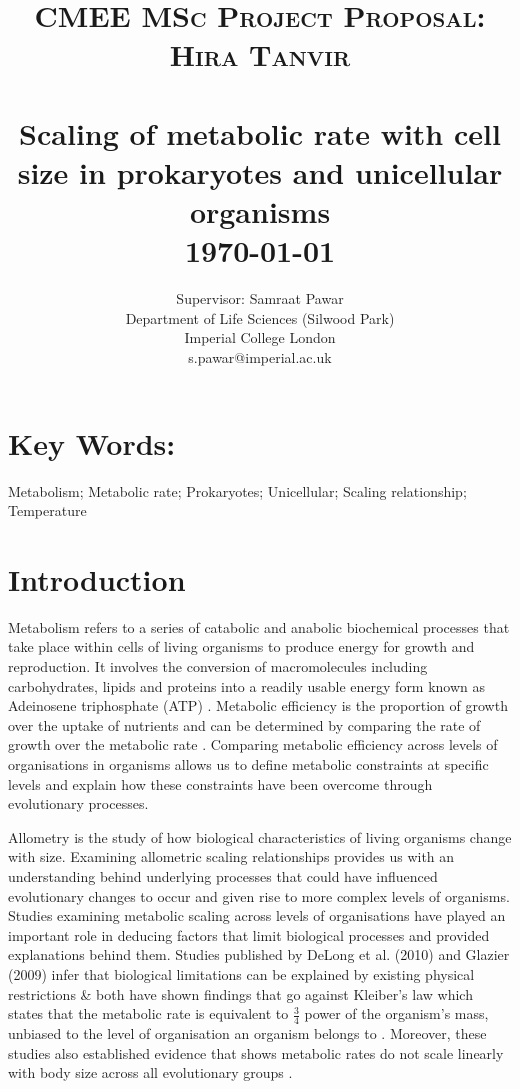 \documentclass[11pt]{report}
\title{	\normalsize \textsc{CMEE MSc Project Proposal:\\ Hira Tanvir} 	%
		 	\\[2cm]								%
			\HRule{0.5pt} \\						%
			\LARGE \textbf{{Scaling of metabolic rate with cell size in prokaryotes and unicellular organisms}}	
			\HRule{2pt} \\ [0.5cm]		%
			\normalsize \today			%
		}
\author{
		Supervisor: Samraat Pawar\\ 
        Department of Life Sciences (Silwood Park)\\ 
        Imperial College London\\ 
        s.pawar@imperial.ac.uk\\
}
\makeatletter
\def\printtitle{%
    {\centering \@title\par}}
\def\printauthor{%
    {\centering \large \@author}}
\makeatother
\begin{document}
\linespread{1.5} 
\thispagestyle{empty}		%

\printtitle					%
  	\vfill
\printauthor				%
\newpage


\setcounter{page}{1}		%
\linenumbers
\section*{Key Words:}
Metabolism; Metabolic rate; Prokaryotes; Unicellular; Scaling relationship; Temperature 
\section*{Introduction}
Metabolism refers to a series of catabolic and anabolic biochemical processes that take place within cells of living organisms to produce energy for growth and reproduction. It involves the conversion of macromolecules including carbohydrates, lipids and proteins into a readily usable energy form known as Adeinosene triphosphate (ATP) \citep{Brown2004}. Metabolic efficiency is the proportion of growth over the uptake of nutrients and can be determined by comparing the rate of growth over the metabolic rate \citep{DeLong2010}. Comparing metabolic efficiency across levels of organisations in organisms allows us to define metabolic constraints at specific levels and explain how these constraints have been overcome through evolutionary processes. 

Allometry is the study of how biological characteristics of living organisms change with size. Examining allometric scaling relationships provides us with an understanding behind underlying processes that could have influenced evolutionary changes to occur and given rise to more complex levels of organisms. Studies examining metabolic scaling across levels of organisations have played an important role in deducing factors that limit biological processes and provided explanations behind them. Studies published by DeLong et al. (2010) and Glazier (2009) infer that biological limitations can be explained by existing physical restrictions \& both have shown findings that go against Kleiber's law which states that the metabolic rate is equivalent to $\frac{3}{4}$ power of the organism's mass, unbiased to the level of organisation an organism belongs to \citep{Glazier}. Moreover, these studies also established evidence that shows metabolic rates do not scale linearly with body size across all evolutionary groups \citep{DeLong2010}.
\end{document}
